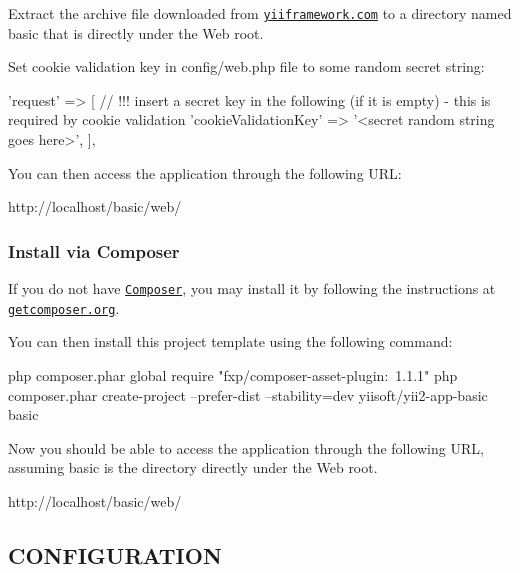 Extract the archive file downloaded from \href{http://www.yiiframework.com/download/}{\tt yiiframework.\+com} to a directory named {\ttfamily basic} that is directly under the Web root.

Set cookie validation key in {\ttfamily config/web.\+php} file to some random secret string\+:


\begin{DoxyCode}
\textcolor{stringliteral}{'request'} => [
    \textcolor{comment}{// !!! insert a secret key in the following (if it is empty) - this is required by cookie validation}
    \textcolor{stringliteral}{'cookieValidationKey'} => \textcolor{stringliteral}{'<secret random string goes here>'},
],
\end{DoxyCode}


You can then access the application through the following U\+RL\+:


\begin{DoxyCode}
http://localhost/basic/web/
\end{DoxyCode}


\subsubsection*{Install via Composer}

If you do not have \href{http://getcomposer.org/}{\tt Composer}, you may install it by following the instructions at \href{http://getcomposer.org/doc/00-intro.md#installation-nix}{\tt getcomposer.\+org}.

You can then install this project template using the following command\+:


\begin{DoxyCode}
php composer.phar global require "fxp/composer-asset-plugin:~1.1.1"
php composer.phar create-project --prefer-dist --stability=dev yiisoft/yii2-app-basic basic
\end{DoxyCode}


Now you should be able to access the application through the following U\+RL, assuming {\ttfamily basic} is the directory directly under the Web root.


\begin{DoxyCode}
http://localhost/basic/web/
\end{DoxyCode}


\subsection*{C\+O\+N\+F\+I\+G\+U\+R\+A\+T\+I\+ON }

